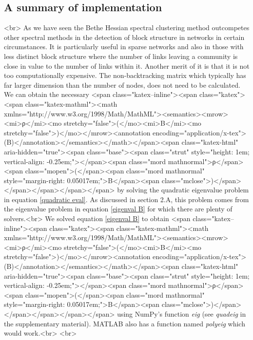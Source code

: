 \subsection{A summary of implementation}<br>
As we have seen the Bethe Hessian spectral clustering method outcompetes other spectral methods in the detection of block structure in networks in certain circumstances. It is particularly useful in sparse networks and also in those with less distinct block structure where the number of links leaving a community is close in value to the number of links within it. Another merit of it is that it is not too computationally expensive. The non-backtracking matrix which typically has far larger dimension than the number of nodes, does not need to be calculated. We can obtain the necessary <span class="katex--inline"><span class="katex"><span class="katex-mathml"><math xmlns="http://www.w3.org/1998/Math/MathML"><semantics><mrow><mi>ρ</mi><mo stretchy="false">(</mo><mi>B</mi><mo stretchy="false">)</mo></mrow><annotation encoding="application/x-tex">\rho(B)</annotation></semantics></math></span><span class="katex-html" aria-hidden="true"><span class="base"><span class="strut" style="height: 1em; vertical-align: -0.25em;"></span><span class="mord mathnormal">ρ</span><span class="mopen">(</span><span class="mord mathnormal" style="margin-right: 0.05017em;">B</span><span class="mclose">)</span></span></span></span></span> by solving the quadratic eigenvalue problem in equation \ref{quadratic eval}. As discussed in section 2.A, this problem comes from the eigenvalue problem in equation \ref{eigenval B} for which there are plenty of solvers.<br>
We solved equation \ref{eigenval B} to obtain <span class="katex--inline"><span class="katex"><span class="katex-mathml"><math xmlns="http://www.w3.org/1998/Math/MathML"><semantics><mrow><mi>ρ</mi><mo stretchy="false">(</mo><mi>B</mi><mo stretchy="false">)</mo></mrow><annotation encoding="application/x-tex">\rho(B)</annotation></semantics></math></span><span class="katex-html" aria-hidden="true"><span class="base"><span class="strut" style="height: 1em; vertical-align: -0.25em;"></span><span class="mord mathnormal">ρ</span><span class="mopen">(</span><span class="mord mathnormal" style="margin-right: 0.05017em;">B</span><span class="mclose">)</span></span></span></span></span> using NumPy’s function \textit{eig} (see \textit{quadeig} in the supplementary material). MATLAB also has a function named \textit{polyeig} which would work.<br>
\newline<br>
